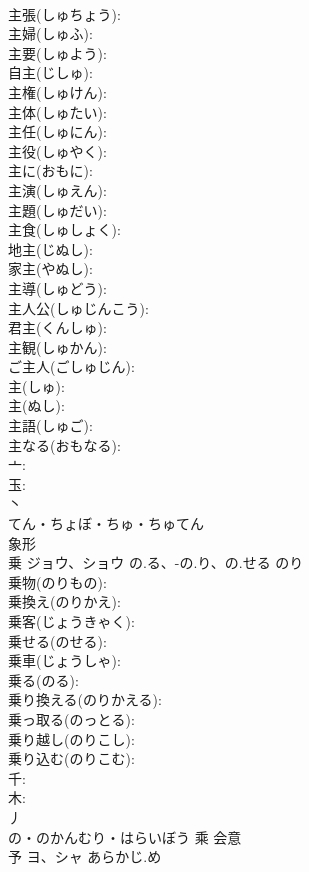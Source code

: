 \documentclass[8pt]{extreport}
\begin{document}
\begin{CJK}{UTF8}{min}
\\	主張(しゅちょう): 
\\	主婦(しゅふ): 
\\	主要(しゅよう): 
\\	自主(じしゅ): 
\\	主権(しゅけん): 
\\	主体(しゅたい): 
\\	主任(しゅにん): 
\\	主役(しゅやく): 
\\	主に(おもに): 
\\	主演(しゅえん): 
\\	主題(しゅだい): 
\\	主食(しゅしょく): 
\\	地主(じぬし): 
\\	家主(やぬし): 
\\	主導(しゅどう): 
\\	主人公(しゅじんこう): 
\\	君主(くんしゅ): 
\\	主観(しゅかん): 
\\	ご主人(ごしゅじん): 
\\	主(しゅ): 
\\	主(ぬし): 
\\	主語(しゅご): 
\\	主なる(おもなる): 
\\	亠: 
\\	玉: 
\\	丶	
\\	てん・ちょぼ・ちゅ・ちゅてん	
\\	象形 
\\	乗	ジョウ、ショウ	の.る、-の.り、の.せる	のり	
\\	乗物(のりもの): 
\\	乗換え(のりかえ): 
\\	乗客(じょうきゃく): 
\\	乗せる(のせる): 
\\	乗車(じょうしゃ): 
\\	乗る(のる): 
\\	乗り換える(のりかえる): 
\\	乗っ取る(のっとる): 
\\	乗り越し(のりこし): 
\\	乗り込む(のりこむ): 
\\	千: 
\\	木: 
\\	丿	
\\	の・のかんむり・はらいぼう	乘	会意 
\\	予	ヨ、シャ	あらかじ.め		

\end{CJK}
\end{document}
